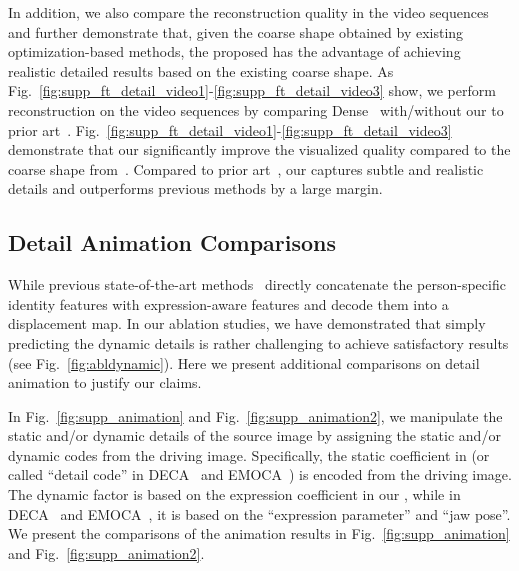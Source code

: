 In addition, we also compare the reconstruction quality in the video sequences and further demonstrate that, given the coarse shape obtained by existing optimization-based methods, the proposed {\module} has the advantage of achieving realistic detailed results based on the existing coarse shape. As Fig.~\ref{fig:supp_ft_detail_video1}-\ref{fig:supp_ft_detail_video3} show, we perform reconstruction on the video sequences by comparing Dense~ with/without our {\module} to prior art~. Fig.~\ref{fig:supp_ft_detail_video1}-\ref{fig:supp_ft_detail_video3} demonstrate that our {\module} significantly improve the visualized quality compared to the coarse shape from~. Compared to prior art~, our {\module} captures subtle and realistic details and outperforms previous methods by a large margin.


\subsection{Detail Animation Comparisons}

While previous state-of-the-art methods~ directly concatenate the person-specific identity features with expression-aware features and decode them into a displacement map. In our ablation studies, we have demonstrated that simply predicting the dynamic details is rather challenging to achieve satisfactory results (see Fig.~\ref{fig:abldynamic}). Here we present additional comparisons on detail animation to justify our claims.

 In Fig.~\ref{fig:supp_animation} and Fig.~\ref{fig:supp_animation2}, we manipulate the static and/or dynamic details of the source image by assigning the static and/or dynamic codes from the driving image. Specifically, the static coefficient in {\name} (or called ``detail code'' in DECA~ and EMOCA~) is encoded from the driving image. The dynamic factor is based on the expression coefficient in our {\name}, while in DECA~ and EMOCA~, it is based on the ``expression parameter'' and ``jaw pose''.
We present the comparisons of the animation results in Fig.~\ref{fig:supp_animation} and Fig.~\ref{fig:supp_animation2}.


